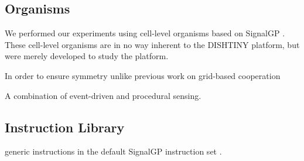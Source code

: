 \subsection{Organisms}



We performed our experiments using cell-level organisms based on SignalGP \cite{lalejini2018evolving}.
These cell-level organisms are in no way inherent to the DISHTINY platform, but were merely developed to study the platform.

In order to ensure symmetry
unlike previous work on grid-based cooperation

A combination of event-driven and procedural sensing.

\subsection{Instruction Library}

generic instructions in the default SignalGP instruction set \cite{lalejini2018evolving}.

